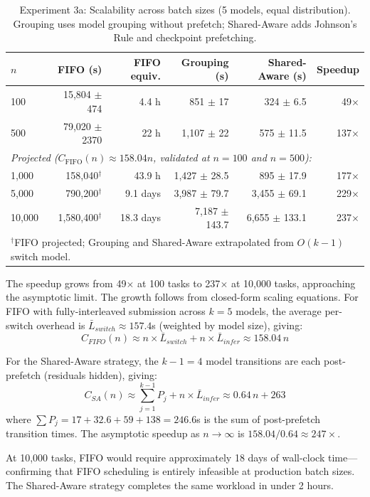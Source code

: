 \documentclass[logo,bsc,singlespacing,parskip,online]{infthesis}
\begin{document}
\begin{table}[htbp]
\centering
\caption{Experiment 3a: Scalability across batch sizes (5 models, equal distribution). Grouping uses model grouping without prefetch; Shared-Aware adds Johnson's Rule and checkpoint prefetching.}
\label{tab:exp3_scale}
\small
\begin{tabular}{lrrrrr}
\toprule
$n$ & FIFO (s) & FIFO equiv. & Grouping (s) & Shared-Aware (s) & Speedup \\
\midrule
100 & 15,804 $\pm$ 474 & 4.4 h & 851 $\pm$ 17 & 324 $\pm$ 6.5 & 49$\times$ \\
500 & 79,020 $\pm$ 2370 & 22 h & 1,107 $\pm$ 22 & 575 $\pm$ 11.5 & 137$\times$ \\
\midrule
\multicolumn{6}{l}{\textit{Projected ($C_\text{FIFO}(n)\approx158.04n$, validated at $n=100$ and $n=500$):}} \\
\midrule
1,000 & 158,040$^\dagger$ & 43.9 h & 1,427 $\pm$ 28.5 & 895 $\pm$ 17.9 & 177$\times$ \\
5,000 & 790,200$^\dagger$ & 9.1 days & 3,987 $\pm$ 79.7 & 3,455 $\pm$ 69.1 & 229$\times$ \\
10,000 & 1,580,400$^\dagger$ & 18.3 days & 7,187 $\pm$ 143.7 & 6,655 $\pm$ 133.1 & 237$\times$ \\
\bottomrule
\multicolumn{6}{l}{$^\dagger$FIFO projected; Grouping and Shared-Aware extrapolated from $O(k{-}1)$ switch model.} \\
\end{tabular}
\normalsize
\end{table}

The speedup grows from 49$\times$ at 100 tasks to 237$\times$ at 10,000 tasks, approaching the asymptotic limit. The growth follows from closed-form scaling equations. For FIFO with fully-interleaved submission across $k=5$ models, the average per-switch overhead is $\bar{L}_{switch} \approx 157.4$s (weighted by model size), giving:
$$C_{FIFO}(n) \approx n \times \bar{L}_{switch} + n \times \bar{L}_{infer} \approx 158.04\,n$$

For the Shared-Aware strategy, the $k{-}1 = 4$ model transitions are each post-prefetch (residuals hidden), giving:
$$C_{SA}(n) \approx \sum_{j=1}^{k-1} P_j + n \times \bar{L}_{infer} \approx 0.64\,n + 263$$
where $\sum P_j = 17 + 32.6 + 59 + 138 = 246.6$s is the sum of post-prefetch transition times. The asymptotic speedup as $n \to \infty$ is $158.04 / 0.64 \approx 247\times$.

At 10,000 tasks, FIFO would require approximately 18 days of wall-clock time---confirming that FIFO scheduling is entirely infeasible at production batch sizes. The Shared-Aware strategy completes the same workload in under 2 hours.
\end{document}
